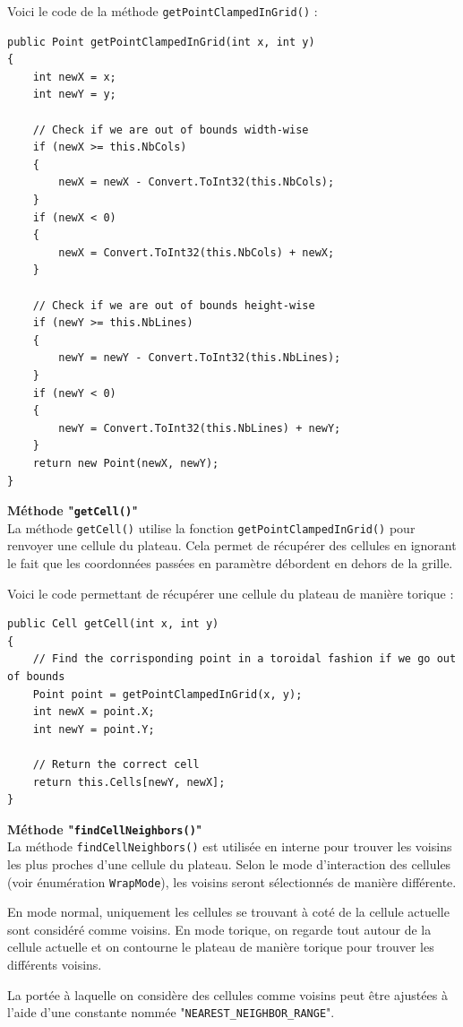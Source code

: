 \documentclass[a4paper, french]{article}
\begin{document}
Voici le code de la méthode \texttt{getPointClampedInGrid()} :
\begin{lstlisting}
public Point getPointClampedInGrid(int x, int y)
{
    int newX = x;
    int newY = y;

    // Check if we are out of bounds width-wise
    if (newX >= this.NbCols)
    {
        newX = newX - Convert.ToInt32(this.NbCols);
    }
    if (newX < 0)
    {
        newX = Convert.ToInt32(this.NbCols) + newX;
    }

    // Check if we are out of bounds height-wise
    if (newY >= this.NbLines)
    {
        newY = newY - Convert.ToInt32(this.NbLines);
    }
    if (newY < 0)
    {
        newY = Convert.ToInt32(this.NbLines) + newY;
    }
    return new Point(newX, newY);
}
\end{lstlisting}


\pagebreak
\textbf{Méthode "\texttt{getCell()}"}\\
La méthode \texttt{getCell()} utilise la fonction \texttt{getPointClampedInGrid()} pour renvoyer une cellule du plateau. Cela permet de récupérer des cellules en ignorant le fait que les coordonnées passées en paramètre débordent en dehors de la grille.

Voici le code permettant de récupérer une cellule du plateau de manière torique :

\begin{lstlisting}
public Cell getCell(int x, int y)
{
    // Find the corrisponding point in a toroidal fashion if we go out of bounds
    Point point = getPointClampedInGrid(x, y);
    int newX = point.X;
    int newY = point.Y;

    // Return the correct cell
    return this.Cells[newY, newX];
}
\end{lstlisting}


\textbf{Méthode "\texttt{findCellNeighbors()}"}\\
La méthode \texttt{findCellNeighbors()} est utilisée en interne pour trouver les voisins les plus proches d'une cellule du plateau. Selon le mode d'interaction des cellules (voir énumération \texttt{WrapMode}), les voisins seront sélectionnés de manière différente.

En mode normal, uniquement les cellules se trouvant à coté de la cellule actuelle sont considéré comme voisins. En mode torique, on regarde tout autour de la cellule actuelle et on contourne le plateau de manière torique pour trouver les différents voisins.

La portée à laquelle on considère des cellules comme voisins peut être ajustées à l'aide d'une constante nommée "\texttt{NEAREST\_NEIGHBOR\_RANGE}".
\end{document}
